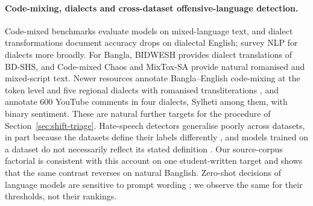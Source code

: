 \paragraph{Code-mixing, dialects and cross-dataset offensive-language detection.}
Code-mixed benchmarks \citep{khanuja2020gluecos, aguilar2020lince, patwa2020sentimix, goswami2023offmix} evaluate models
on mixed-language text, and dialect transformations \citep{ziems2023multivalue} document accuracy drops on dialectal
English; \citet{joshi2025dialects} survey NLP for dialects more broadly. For Bangla, BIDWESH \citep{bidwesh} provides dialect translations of BD-SHS, and Code-mixed Chaos
\citep{codemixedchaos} and MixTox-SA \citep{mixtox} provide natural romanised and mixed-script text. Newer resources annotate Bangla--English code-mixing at the token
level \citep{afridi2026banglamix} and five regional dialects with romanised transliterations
\citep{jawad2026fivedialects}, and \citet{jawad2025benchmarking} annotate 600 YouTube comments in four dialects, Sylheti
among them, with binary sentiment. These are natural further targets for the procedure of
Section~\ref{sec:shift-triage}.
Hate-speech
detectors generalise poorly across datasets, in part because the datasets define their labels differently
\citep{fortuna2020toxic, yin2021generalisable, fortuna2021generalize}, and models trained on a dataset do not
necessarily reflect its stated definition \citep{khurana2025defverify}. Our source-corpus factorial is consistent with
this account on one student-written target and shows that the same contrast reverses on natural Banglish. Zero-shot
decisions of language models are sensitive to prompt wording \citep{seleznyov2025punctuation}; we observe the same for
their thresholds, not their rankings.
